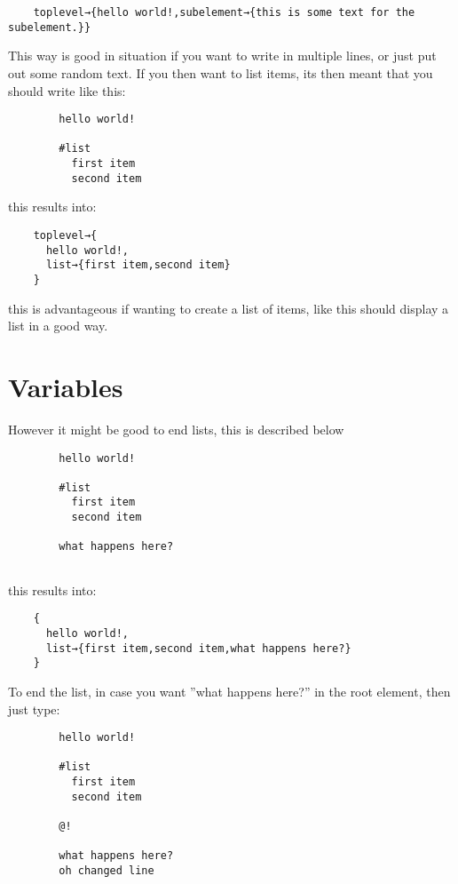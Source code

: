 \documentclass{book}
\begin{document}
	\begin{verbatim}
	toplevel→{hello world!,subelement→{this is some text for the subelement.}}
	\end{verbatim}
	
	This way is good in situation if you want to write in multiple lines, or just put out some random text.
	If you then want to list items, its then meant that you should write like this:
	
	\begin{verbatim}
		hello world!
		
		#list
		  first item
		  second item
	\end{verbatim}
	
	this results into:
	
	\begin{verbatim}
	toplevel→{
	  hello world!,
	  list→{first item,second item}
	}
	\end{verbatim}
	
	this is advantageous if wanting to create a list of items, like this should display a list in a good way.
	
	\section{Variables}
	
	However it might be good to end lists, this is described below
	
	\begin{verbatim}
		hello world!
		
		#list
		  first item
		  second item
			
		what happens here?
		
	\end{verbatim}
	
	this results into:
	
	\begin{verbatim}
	{
	  hello world!,
	  list→{first item,second item,what happens here?}
	}
	\end{verbatim}
	
	To end the list, in case you want ''what happens here?'' in the root element, then just type:
	
	\begin{verbatim}
		hello world!
		
		#list
		  first item
		  second item
		
		@!
		
		what happens here?
		oh changed line
		
	\end{verbatim}
	
\end{document}
